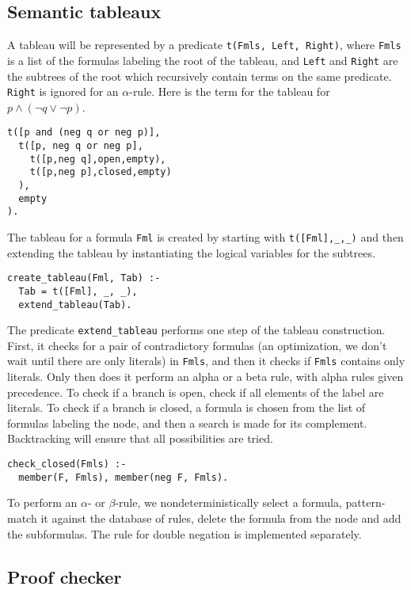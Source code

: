\documentclass[11pt]{article}
\newcommand*{\p}[1]{\textup{\texttt{#1}}}
\begin{document}
\subsection{Semantic tableaux}\label{s.tabprop}

A tableau will be represented by a predicate \p{t(Fmls, Left, Right)},
where \p{Fmls} is a list of the formulas labeling the root of the
tableau, and \p{Left} and \p{Right} are the subtrees of the root which
recursively contain terms on the same predicate. \p{Right} is ignored
for an $\alpha$-rule. Here is the term for the tableau for $p \wedge
(\neg q \vee \neg p)$.

\begin{verbatim}
t([p and (neg q or neg p)],
  t([p, neg q or neg p],
    t([p,neg q],open,empty),
    t([p,neg p],closed,empty)
  ),
  empty
).
\end{verbatim}

The tableau for a formula \p{Fml} is created by starting with
\p{t([Fml],\_,\_)} and then extending the tableau by instantiating the
logical variables for the subtrees.

\begin{verbatim}
create_tableau(Fml, Tab) :-
  Tab = t([Fml], _, _), 
  extend_tableau(Tab).
\end{verbatim}

The predicate \p{extend\_tableau} performs one step of the tableau
construction. First, it checks for a pair of contradictory formulas (an
optimization, we don't wait until there are only literals) in \p{Fmls},
and then it checks if \p{Fmls} contains only literals. Only then does it
perform an alpha or a beta rule, with alpha rules given precedence. To
check if a branch is open, check if all elements of the label are
literals. To check if a branch is closed, a formula is chosen from the
list of formulas labeling the node, and then a search is made for its
complement. Backtracking will ensure that all possibilities are tried.

\begin{verbatim}
check_closed(Fmls) :-
  member(F, Fmls), member(neg F, Fmls).
\end{verbatim}

To perform an $\alpha$- or $\beta$-rule, we nondeterministically select
a formula, pattern-match it against the database of rules, delete the
formula from the node and add the subformulas. The rule for double
negation is implemented separately.



\subsection{Proof checker}\label{s.checkprop}
\end{document}
